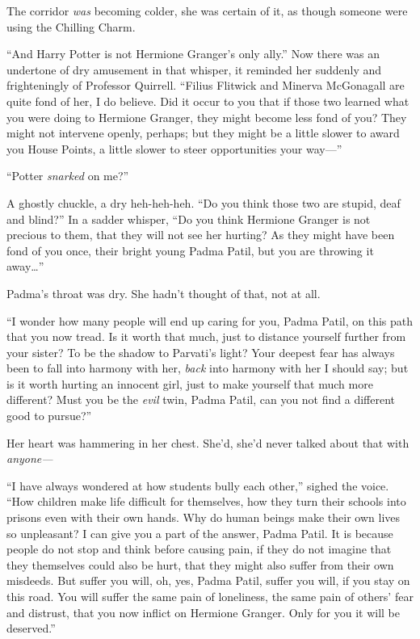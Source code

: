 The corridor \emph{was} becoming colder, she was certain of it, as
though someone were using the Chilling Charm.

``And Harry Potter is not Hermione Granger's only ally.'' Now there was
an undertone of dry amusement in that whisper, it reminded her suddenly
and frighteningly of Professor Quirrell. ``Filius Flitwick and Minerva
McGonagall are quite fond of her, I do believe. Did it occur to you that
if those two learned what you were doing to Hermione Granger, they might
become less fond of you? They might not intervene openly, perhaps; but
they might be a little slower to award you House Points, a little slower
to steer opportunities your way---''

``Potter \emph{snarked} on me?''

A ghostly chuckle, a dry heh-heh-heh. ``Do you think those two are
stupid, deaf and blind?'' In a sadder whisper, ``Do you think Hermione
Granger is not precious to them, that they will not see her hurting? As
they might have been fond of you once, their bright young Padma Patil,
but you are throwing it away\ldots{}''

Padma's throat was dry. She hadn't thought of that, not at all.

``I wonder how many people will end up caring for you, Padma Patil, on
this path that you now tread. Is it worth that much, just to distance
yourself further from your sister? To be the shadow to Parvati's light?
Your deepest fear has always been to fall into harmony with her,
\emph{back} into harmony with her I should say; but is it worth hurting
an innocent girl, just to make yourself that much more different? Must
you be the \emph{evil} twin, Padma Patil, can you not find a different
good to pursue?''

Her heart was hammering in her chest. She'd, she'd never talked about
that with \emph{anyone---}

``I have always wondered at how students bully each other,'' sighed the
voice. ``How children make life difficult for themselves, how they turn
their schools into prisons even with their own hands. Why do human
beings make their own lives so unpleasant? I can give you a part of the
answer, Padma Patil. It is because people do not stop and think before
causing pain, if they do not imagine that they themselves could also be
hurt, that they might also suffer from their own misdeeds. But suffer
you will, oh, yes, Padma Patil, suffer you will, if you stay on this
road. You will suffer the same pain of loneliness, the same pain of
others' fear and distrust, that you now inflict on Hermione Granger.
Only for you it will be deserved.''

